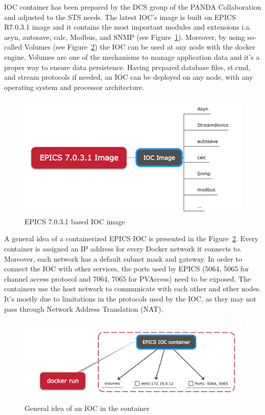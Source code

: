 IOC container has been prepared by the \gls{DCS} group of the \gls{PANDA} Collaboration and adjusted to the \gls{STS} needs. The latest \gls{IOC}'s image is built on EPICS R7.0.3.1 image and it contains the most important modules and extensions i.a. asyn, autosave, calc, Modbus, and SNMP (see Figure~\ref{fig_ioc1}). Moreover, by using so-called Volumes (see Figure~\ref{fig_doc}) the \gls{IOC} can be used at any node with the docker engine. Volumes are one of the mechanisms to manage application data and it's a proper way to ensure data persistence. Having prepared database files, st.cmd, and stream protocols if needed, an \gls{IOC} can be deployed on any node, with any operating system and processor architecture.
\begin{figure}[!h]
\centering
\includegraphics[width=0.7\columnwidth]{Chapter4/images/epics_ioc.jpg}
\caption{EPICS 7.0.3.1 based \gls{IOC} image}
\label{fig_ioc1}
\end{figure}
A general idea of a containerized \gls{EPICS} \gls{IOC} is presented in the Figure~\ref{fig_doc}. Every container is assigned an IP address for every Docker network it connects to. Moreover, each network has a default subnet mask and gateway. In order to connect the \gls{IOC} with other services, the ports used by \gls{EPICS} (5064, 5065 for channel access protocol and 7064, 7065 for PVAccess) need to be exposed.  The containers use the host network to communicate with each other and other nodes. It's mostly due to limitations in the protocols used by the \gls{IOC}, as they may not pass through Network Address Translation (NAT).
\begin{figure}[!h]
\centering
\includegraphics[width=0.75\columnwidth]{Chapter4/images/docker_run.jpg}
\caption{General idea of an \gls{IOC} in the container}
\label{fig_doc}
\end{figure}

